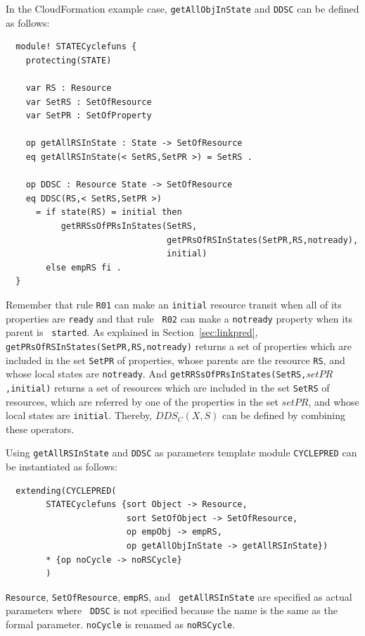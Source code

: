 \documentclass[12pt]{report}
\newcommand{\stt}[1]{{\small{\tt {#1}}}}
\begin{document}
In the CloudFormation example case, {\tt getAllObjInState} and {\tt DDSC} can be defined as
follows:
\small
\begin{verbatim}
  module! STATECyclefuns {
    protecting(STATE)
  
    var RS : Resource
    var SetRS : SetOfResource
    var SetPR : SetOfProperty
  
    op getAllRSInState : State -> SetOfResource
    eq getAllRSInState(< SetRS,SetPR >) = SetRS .
  
    op DDSC : Resource State -> SetOfResource
    eq DDSC(RS,< SetRS,SetPR >)
      = if state(RS) = initial then
           getRRSsOfPRsInStates(SetRS,
                                getPRsOfRSInStates(SetPR,RS,notready),
                                initial)
        else empRS fi .
  }
\end{verbatim}
\normalsize
Remember that rule {\tt R01} can make an {\tt initial} resource
transit when all of its properties are {\tt ready} and that rule {\tt
  R02} can make a {\tt notready} property when its parent is {\tt
  started}. As explained in Section~\ref{sec:linkpred},
\stt{getPRsOfRSInStates(SetPR,RS,notready)} returns a set of
properties which are included in the set {\tt SetPR} of properties,
whose parents are the resource {\tt RS}, and whose local states are
{\tt notready}. And \stt{getRRSsOfPRsInStates(SetRS,$setPR$,initial)}
returns a set of resources which are included in the set
{\tt SetRS} of resources, which are referred by one of the properties in the set $setPR$,
and whose local states are {\tt initial}. Thereby, $\mathit{DDS_C}(X,S)$ can be
defined by combining these operators.

Using {\tt getAllRSInState} and {\tt DDSC} as parameters template
module {\tt CYCLEPRED} can be instantiated as follows:
\small
\begin{verbatim}
  extending(CYCLEPRED(
        STATECyclefuns {sort Object -> Resource,
                        sort SetOfObject -> SetOfResource,
                        op empObj -> empRS,
                        op getAllObjInState -> getAllRSInState})
        * {op noCycle -> noRSCycle}
        )
\end{verbatim}
\normalsize
 {\tt Resource}, {\tt SetOfResource}, {\tt empRS}, and {\tt
   getAllRSInState} are specified as actual parameters where {\tt
   DDSC} is not specified because the name is the same as the formal
 parameter.  {\tt noCycle} is renamed as {\tt noRSCycle}.
\end{document}
